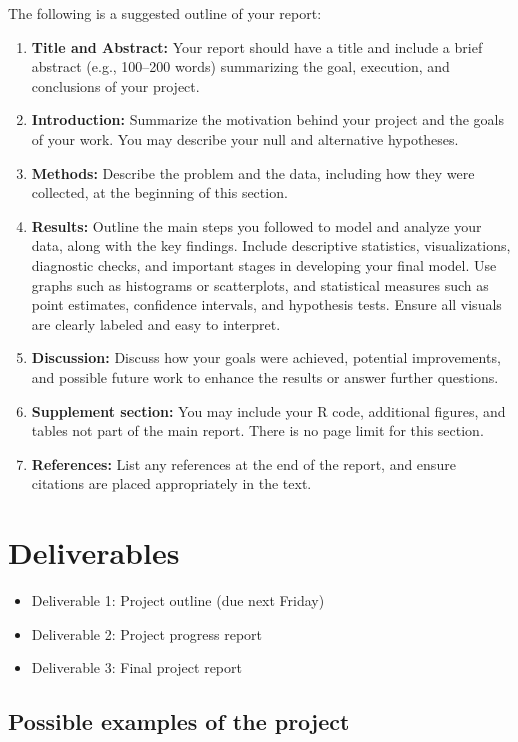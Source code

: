\documentclass[12pt]{article}
\begin{document}
The following is a suggested outline of your report:  
\begin{enumerate}
    \item \textbf{Title and Abstract:} Your report should have a title and include a brief abstract (e.g., 100--200 words) summarizing the goal, execution, and conclusions of your project.  
    \item \textbf{Introduction:} Summarize the motivation behind your project and the goals of your work. You may describe your null and alternative hypotheses.  
    \item \textbf{Methods:} Describe the problem and the data, including how they were collected, at the beginning of this section.  
    \item \textbf{Results:} Outline the main steps you followed to model and analyze your data, along with the key findings. Include descriptive statistics, visualizations, diagnostic checks, and important stages in developing your final model. Use graphs such as histograms or scatterplots, and statistical measures such as point estimates, confidence intervals, and hypothesis tests. Ensure all visuals are clearly labeled and easy to interpret.  
    \item \textbf{Discussion:} Discuss how your goals were achieved, potential improvements, and possible future work to enhance the results or answer further questions.  
    \item \textbf{Supplement section:} You may include your R code, additional figures, and tables not part of the main report. There is no page limit for this section.  
    \item \textbf{References:} List any references at the end of the report, and ensure citations are placed appropriately in the text.  
\end{enumerate}

\section*{Deliverables}

\begin{itemize}
    \item Deliverable 1: Project outline (due next Friday)  
    \item Deliverable 2: Project progress report  
    \item Deliverable 3: Final project report  
\end{itemize}

\subsection*{Possible examples of the project}
\end{document}
